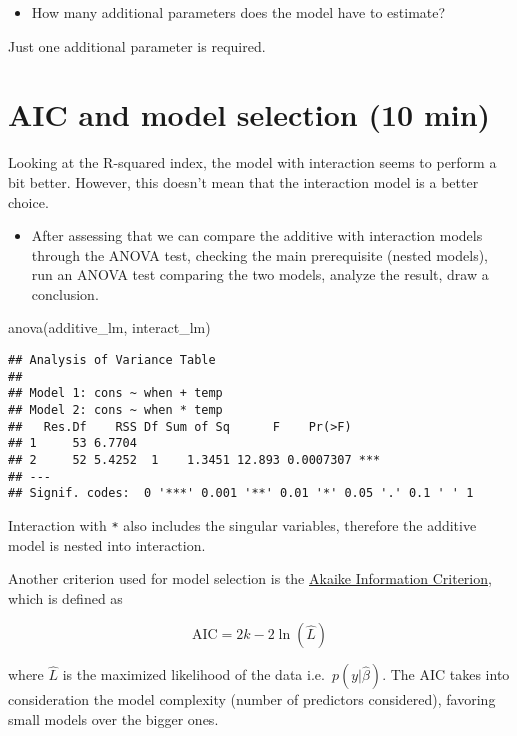 \documentclass[
  oneside]{book}
\newenvironment{Shaded}{\begin{snugshade}}{\end{snugshade}}
\newcommand{\FunctionTok}[1]{\textcolor[rgb]{0.00,0.00,0.00}{#1}}
\newcommand{\NormalTok}[1]{#1}
\providecommand{\tightlist}{%
  \setlength{\itemsep}{0pt}\setlength{\parskip}{0pt}}
\begin{document}
\begin{itemize}
\tightlist
\item
  How many additional parameters does the model have to estimate?
\end{itemize}

Just one additional parameter is required.

\hypertarget{aic-and-model-selection-10-min}{%
\section{AIC and model selection (10 min)}\label{aic-and-model-selection-10-min}}

Looking at the R-squared index, the model with interaction seems
to perform a bit better. However, this doesn't mean that the interaction
model is a better choice.

\begin{itemize}
\tightlist
\item
  After assessing that we can compare the additive with interaction models
  through the ANOVA test, checking the main prerequisite (nested models),
  run an ANOVA test comparing the two models, analyze the result,
  draw a conclusion.
\end{itemize}

\begin{Shaded}
\begin{Highlighting}[]
\FunctionTok{anova}\NormalTok{(additive\_lm, interact\_lm)}
\end{Highlighting}
\end{Shaded}

\begin{verbatim}
## Analysis of Variance Table
## 
## Model 1: cons ~ when + temp
## Model 2: cons ~ when * temp
##   Res.Df    RSS Df Sum of Sq      F    Pr(>F)    
## 1     53 6.7704                                  
## 2     52 5.4252  1    1.3451 12.893 0.0007307 ***
## ---
## Signif. codes:  0 '***' 0.001 '**' 0.01 '*' 0.05 '.' 0.1 ' ' 1
\end{verbatim}

Interaction with \texttt{*} also includes the singular
variables, therefore the additive model is nested into interaction.

Another criterion used for model selection is the \href{https://en.wikipedia.org/wiki/Akaike_information_criterion}{Akaike Information
Criterion},
which is defined as

\[
\text{AIC} = 2k - 2\ln(\hat L)
\]

where \(\hat L\) is the maximized likelihood of the data
i.e.~\(p(y | \hat \beta)\). The AIC takes into consideration
the model complexity (number of predictors considered),
favoring small models over the bigger ones.
\end{document}
